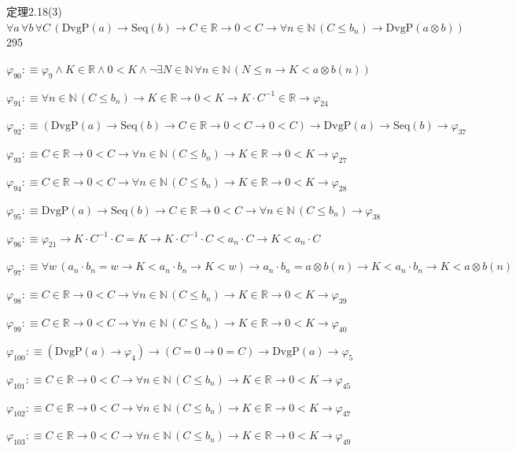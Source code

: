 \begin{fullproof}{定理2.18(3)}{$\forall a\,\forall b\,\forall C\,(\mathrm{DvgP}(a) \to \mathrm{Seq}(b) \to C \in \mathbb{R} \to 0 < C \to \forall n \in \mathbb{N}\,(C \leq b_{n}) \to \mathrm{DvgP}(a \otimes b))$}{295}
\begin{abbrevlist}
\item $\varphi_{90} :\equiv \varphi_{9} \land K \in \mathbb{R} \land 0 < K \land \neg \exists N \in \mathbb{N}\,\forall n \in \mathbb{N}\,(N \leq n \to K < a \otimes b(n))$
\item $\varphi_{91} :\equiv \forall n \in \mathbb{N}\,(C \leq b_{n}) \to K \in \mathbb{R} \to 0 < K \to K \cdot C^{-1} \in \mathbb{R} \to \varphi_{24}$
\item $\varphi_{92} :\equiv (\mathrm{DvgP}(a) \to \mathrm{Seq}(b) \to C \in \mathbb{R} \to 0 < C \to 0 < C) \to \mathrm{DvgP}(a) \to \mathrm{Seq}(b) \to \varphi_{37}$
\item $\varphi_{93} :\equiv C \in \mathbb{R} \to 0 < C \to \forall n \in \mathbb{N}\,(C \leq b_{n}) \to K \in \mathbb{R} \to 0 < K \to \varphi_{27}$
\item $\varphi_{94} :\equiv C \in \mathbb{R} \to 0 < C \to \forall n \in \mathbb{N}\,(C \leq b_{n}) \to K \in \mathbb{R} \to 0 < K \to \varphi_{28}$
\item $\varphi_{95} :\equiv \mathrm{DvgP}(a) \to \mathrm{Seq}(b) \to C \in \mathbb{R} \to 0 < C \to \forall n \in \mathbb{N}\,(C \leq b_{n}) \to \varphi_{38}$
\item $\varphi_{96} :\equiv \varphi_{21} \to K \cdot C^{-1} \cdot C = K \to K \cdot C^{-1} \cdot C < a_{n} \cdot C \to K < a_{n} \cdot C$
\item $\varphi_{97} :\equiv \forall w\,(a_{n} \cdot b_{n} = w \to K < a_{n} \cdot b_{n} \to K < w) \to a_{n} \cdot b_{n} = a \otimes b(n) \to K < a_{n} \cdot b_{n} \to K < a \otimes b(n)$
\item $\varphi_{98} :\equiv C \in \mathbb{R} \to 0 < C \to \forall n \in \mathbb{N}\,(C \leq b_{n}) \to K \in \mathbb{R} \to 0 < K \to \varphi_{39}$
\item $\varphi_{99} :\equiv C \in \mathbb{R} \to 0 < C \to \forall n \in \mathbb{N}\,(C \leq b_{n}) \to K \in \mathbb{R} \to 0 < K \to \varphi_{40}$
\item $\varphi_{100} :\equiv (\mathrm{DvgP}(a) \to \varphi_{4}) \to (C = 0 \to 0 = C) \to \mathrm{DvgP}(a) \to \varphi_{5}$
\item $\varphi_{101} :\equiv C \in \mathbb{R} \to 0 < C \to \forall n \in \mathbb{N}\,(C \leq b_{n}) \to K \in \mathbb{R} \to 0 < K \to \varphi_{45}$
\item $\varphi_{102} :\equiv C \in \mathbb{R} \to 0 < C \to \forall n \in \mathbb{N}\,(C \leq b_{n}) \to K \in \mathbb{R} \to 0 < K \to \varphi_{47}$
\item $\varphi_{103} :\equiv C \in \mathbb{R} \to 0 < C \to \forall n \in \mathbb{N}\,(C \leq b_{n}) \to K \in \mathbb{R} \to 0 < K \to \varphi_{49}$

\end{abbrevlist}
\end{fullproof}
